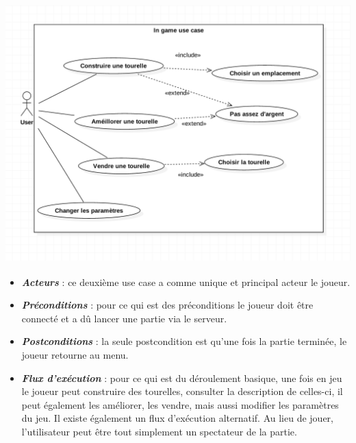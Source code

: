 \documentclass[10pt,a4paper]{article}
\begin{document}
\begin{center}
    \includegraphics[height=10cm,width=14cm]{ingame_use_case.png}
\end{center}
 
\begin{itemize}
\item \textit{\textbf{Acteurs}} : ce deuxième use case a comme unique et principal acteur le \gls{joueur}.\\

\item \textit{\textbf{Préconditions}} : pour ce qui est des préconditions le \gls{joueur} doit être connecté et a dû lancer une partie via le \gls{serveur}.\\

\item \textit{\textbf{Postconditions}} : la seule postcondition est qu'une fois la partie terminée, le \gls{joueur} retourne au menu.\\

\item \textit{\textbf{Flux d'exécution}} : pour ce qui est du déroulement basique, une fois en jeu le \gls{joueur} peut construire des tourelles, consulter la description de celles-ci, il peut également les améliorer, les vendre, mais aussi modifier les paramètres du jeu. Il existe également un flux d'exécution alternatif. Au lieu de jouer, l'\gls{utilisateur} peut être tout simplement un spectateur de la partie.

\end{itemize}
\end{document}
